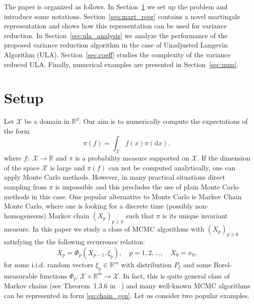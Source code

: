 \documentclass[article]{elsarticle}
\def\rmd{\mathrm{d}}
\begin{document}
\par
The paper is organized as follows.  In Section~\ref{sec:setup} we set up the problem and introduce some notations. Section~\ref{seq:mart_repr} contains a novel martingale representation and shows how this representation can be used for variance reduction. In Section~\ref{sec:ula_analysis} we analyze the performance of the proposed variance reduction algorithm in the case of Unadjusted Langevin Algorithm (ULA). Section~\ref{sec:coeff} studies the complexity of the variance reduced ULA. Finally, numerical examples are presented in Section~\ref{sec:num}.
\section{Setup}\label{sec:setup}
Let  \(\mathcal{X}\) be a domain in \( \mathbb{R}^d.\)  Our aim is to numerically compute the expectations of the form
\[
\pi(f)=\int_{\mathcal{X}} f(x)\pi(\rmd x),
\]
where \(f:\) \(\mathcal{X}\longrightarrow \mathbb{R}\) and \(\pi\) is a probability measure supported on \(\mathcal{X}.\)
If  the dimension of the space \(\mathcal{X}\) is large and \(\pi(f)\) can not be computed analytically, one can apply Monte Carlo methods. However, in many practical situations  direct sampling from \(\pi\) is impossible and this precludes the use of plain Monte Carlo methods in this case. One popular alternative to Monte Carlo  is Markov Chain Monte Carlo, where one is looking for a discrete time  (possibly non-homogeneous) Markov chain   \((X_p)_{p\geq 0}\) such that \(\pi\) is its unique invariant measure. In this paper we study a class of MCMC algorithms with \((X_p)_{p\geq 0}\) satisfying the  the following recurrence relation:
\begin{equation}
\label{eq:chain_gen}
X_{p}=\Phi_{p}(X_{p-1},\xi_{p}),\quad p=1,2,\ldots ,\quad X_{0}=x_0,
\end{equation}
for some i.i.d.  random vectors \(\xi_p\in \mathbb{R}^m\) with distribution \(P_{\xi}\)
and some Borel-measurable
functions $\Phi_{p}\colon\mathcal{X}\times\mathbb{R}^{m}\to\mathcal{X}.$
In fact, this is quite general class of Markov chains (see Theorem~1.3.6 in ~\cite{moulines2018})
and many well-known MCMC algorithms can be represented in form \eqref{eq:chain_gen}.
Let us consider two popular examples.
\end{document}
